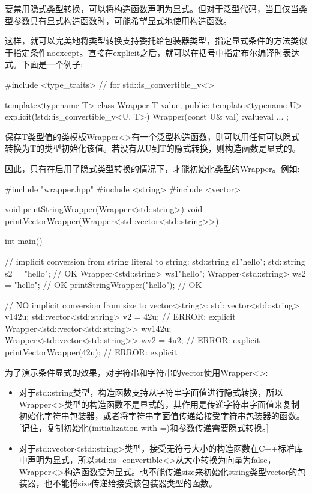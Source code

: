 
要禁用隐式类型转换，可以将构造函数声明为显式。但对于泛型代码，当且仅当类型参数具有显式构造函数时，可能希望显式地使用构造函数。

这样，就可以完美地将类型转换支持委托给包装器类型，指定显式条件的方法类似于指定条件noexcept。直接在explicit之后，就可以在括号中指定布尔编译时表达式。下面是一个例子:


\begin{cpp}
#include <type_traits> // for std::is_convertible_v<>

template<typename T>
class Wrapper {
	T value;
public:
	template<typename U>
	explicit(!std::is_convertible_v<U, T>)
	Wrapper(const U& val)
	:value{val} {
	}
	...
};
\end{cpp}

保存T类型值的类模板Wrapper<>有一个泛型构造函数，则可以用任何可以隐式转换为T的类型初始化该值。若没有从U到T的隐式转换，则构造函数是显式的。

因此，只有在启用了隐式类型转换的情况下，才能初始化类型的Wrapper。例如:


\begin{cpp}
#include "wrapper.hpp"
#include <string>
#include <vector>

void printStringWrapper(Wrapper<std::string>) {
}
void printVectorWrapper(Wrapper<std::vector<std::string>>) {
}

int main()
{
	// implicit conversion from string literal to string:
	std::string s1{"hello"};
	std::string s2 = "hello"; // OK
	Wrapper<std::string> ws1{"hello"};
	Wrapper<std::string> ws2 = "hello"; // OK
	printStringWrapper("hello"); // OK
	
	// NO implicit conversion from size to vector<string>:
	std::vector<std::string> v1{42u};
	std::vector<std::string> v2 = 42u; // ERROR: explicit
	Wrapper<std::vector<std::string>> wv1{42u};
	Wrapper<std::vector<std::string>> wv2 = 4u2; // ERROR: explicit
	printVectorWrapper(42u); // ERROR: explicit
}
\end{cpp}

为了演示条件显式的效果，对字符串和字符串的vector使用Wrapper<>:

\begin{itemize}
\item 
对于std::string类型，构造函数支持从字符串字面值进行隐式转换，所以Wrapper<>类型的构造函数不是显式的，其作用是传递字符串字面值来复制初始化字符串包装器，或者将字符串字面值传递给接受字符串包装器的函数。[记住，复制初始化(initialization with =)和参数传递需要隐式转换。]

\item
对于std::vector<std::string>类型，接受无符号大小的构造函数在C++标准库中声明为显式，所以std::is\_convertible<>从大小转换为向量为false，Wrapper<>构造函数变为显式。也不能传递size来初始化string类型vector的包装器，也不能将size传递给接受该包装器类型的函数。
\end{itemize}

